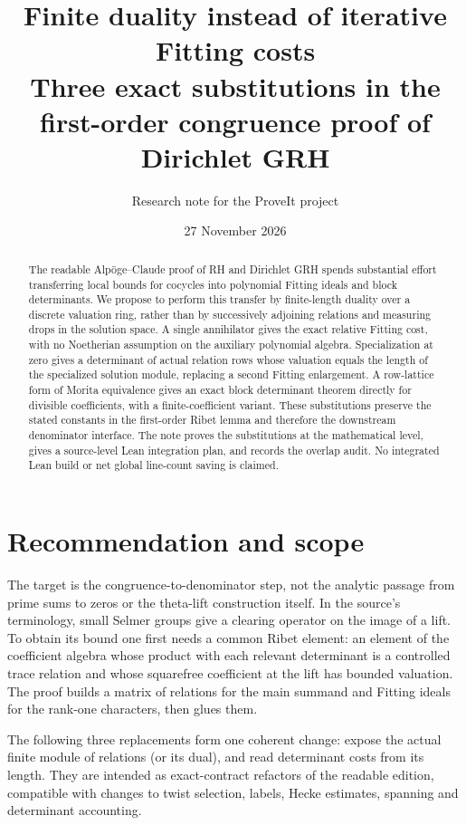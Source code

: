 \documentclass[11pt]{article}
\title{\bfseries Finite duality instead of iterative Fitting costs\\[4pt]\large Three exact substitutions in the first-order congruence proof of Dirichlet GRH}
\author{Research note for the ProveIt project}
\date{27 November 2026}
\theoremstyle{remark}\newtheorem{remark}[theorem]{Remark}
\begin{document}
\maketitle
\begin{abstract}
The readable Alp\"oge--Claude proof of RH and Dirichlet GRH spends substantial effort transferring local bounds for cocycles into polynomial Fitting ideals and block determinants. We propose to perform this transfer by finite-length duality over a discrete valuation ring, rather than by successively adjoining relations and measuring drops in the solution space. A single annihilator gives the exact relative Fitting cost, with no Noetherian assumption on the auxiliary polynomial algebra. Specialization at zero gives a determinant of actual relation rows whose valuation equals the length of the specialized solution module, replacing a second Fitting enlargement. A row-lattice form of Morita equivalence gives an exact block determinant theorem directly for divisible coefficients, with a finite-coefficient variant. These substitutions preserve the stated constants in the first-order Ribet lemma and therefore the downstream denominator interface. The note proves the substitutions at the mathematical level, gives a source-level Lean integration plan, and records the overlap audit. No integrated Lean build or net global line-count saving is claimed.
\end{abstract}
\tableofcontents
\section{Recommendation and scope}
The target is the congruence-to-denominator step, not the analytic passage from prime sums to zeros or the theta-lift construction itself. In the source's terminology, small Selmer groups give a clearing operator on the image of a lift. To obtain its bound one first needs a common Ribet element: an element of the coefficient algebra whose product with each relevant determinant is a controlled trace relation and whose squarefree coefficient at the lift has bounded valuation. The proof builds a matrix of relations for the main summand and Fitting ideals for the rank-one characters, then glues them.

The following three replacements form one coherent change: expose the actual finite module of relations (or its dual), and read determinant costs from its length. They are intended as exact-contract refactors of the readable edition, compatible with changes to twist selection, labels, Hecke estimates, spanning and determinant accounting.
\end{document}
